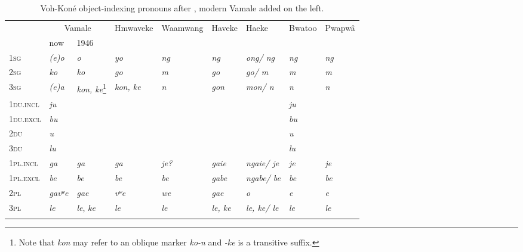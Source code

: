 \begin{sidewaystable}
	\caption{Voh-Koné object-indexing pronouns after \textcite[504--507]{leenhardt_langues_1946}, modern Vamale added on the left.}
	\begin{tabular}{lllllllll}%
	\lsptoprule
		& \multicolumn{2}{c}{Vamale}&	Hmwaveke&	Waamwang&Haveke&	Haeke&	Bwatoo &Pwapwâ\\\cmidrule(lr){2-3}
		&   now   & 1946 & \\\midrule
		1\textsc{sg}	&\textit{ (e)o}&	\textit{o}&	\textit{yo}&	\textit{ng}&	\textit{ng}&	\textit{ong/ ng}&	\textit{ng}&\textit{ng}\\
		2\textsc{sg}&	\textit{ko}&	\textit{ko}&	\textit{go}&	\textit{m}&	\textit{go}&	\textit{go/ m}&	\textit{m}&\textit{m}\\
		3\textsc{sg}&\textit{(e)a}&	\textit{kon, ke}\footnote{Note that \textit{kon} may refer to an oblique marker \textit{ko-n} and \textit{-ke} is a transitive suffix.}&	\textit{kon, ke}&	\textit{n}&	\textit{gon}&	\textit{mon/ n}&	\textit{n}&\textit{n}\\
		1\textsc{du}.\textsc{incl}&	\textit{ju}&	&&&	&&					\textit{ju}&\\
		1\textsc{du}.\textsc{excl}&	\textit{bu}&			&&&&&				\textit{bu}&\\
		2\textsc{du}&	\textit{u}	&			&&&&&			\textit{u}&\\
		3\textsc{du}&	\textit{lu}	&					&&&&&	\textit{lu}&\\
		1\textsc{pl}.\textsc{incl}&	\textit{ga}&	\textit{ga}&	\textit{ga}&	\textit{je?}&	\textit{gaie}&	\textit{ngaie/ je}&	\textit{je}&\textit{je}\\
		1\textsc{pl}.\textsc{excl}&	\textit{be}&	\textit{be}&	\textit{be}&	\textit{be}&	\textit{gabe}&	\textit{ngabe/ be}&	\textit{be}&\textit{be}\\
		2\textsc{pl}&	\textit{gavʷe}&	\textit{gae}&	\textit{vʷe}&	\textit{we}&		\textit{gae}& \textit{o}&	\textit{e}&\textit{e}\\
		3\textsc{pl}&	\textit{le}&	\textit{le}, \textit{ke}&	\textit{le}&	\textit{le}&	\textit{le, ke}&	\textit{le, ke/ le}&	\textit{le}&\textit{le}\\
	\lspbottomrule
	\end{tabular}
	\label{tab:LeenhardtPN}
\end{sidewaystable}

